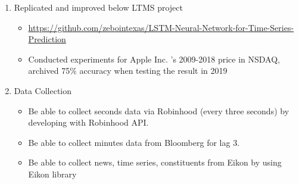 \begin{enumerate}

    \item{Replicated and improved below LTMS project
    \begin{itemize}
    
  
    \item \url{https://github.com/zebointexas/LSTM-Neural-Network-for-Time-Series-Prediction}
    
    \item Conducted experiments for Apple Inc. 's 2009-2018 price in NSDAQ, archived 75\% accuracy when testing the result in 2019 
    
    \end{itemize}
    }
    
    
    
    
    \item{Data Collection 
    \begin{itemize}
      \item Be able to collect seconds data via Robinhood (every three seconds) by developing with Robinhood API.
      \item Be able to collect minutes data from Bloomberg for lag 3. 
      \item Be able to collect news, time series, constituents from Eikon by using Eikon library 
    
    \end{itemize}
    }
\end{enumerate}

 